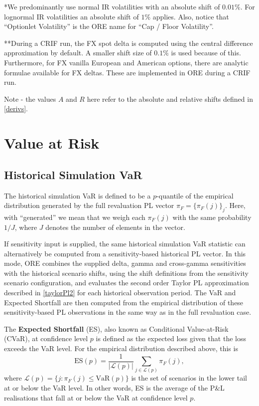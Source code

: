 \newpage
*We predominantly use normal IR volatilities with an absolute shift of $0.01\%$. For lognormal IR volatilities an absolute shift of $1\%$ applies. Also, notice that ``Optionlet Volatility'' is the ORE name for ``Cap / Floor Volatility''.

**During a CRIF run, the FX spot delta is computed using the central difference approximation by default. A smaller shift size of $0.1\%$ is used because of this. Furthermore, for FX vanilla European and American options, there are analytic formulae available for FX deltas. These are implemented in ORE during a CRIF run.

Note - the values $A$ and $R$ here refer to the absolute and relative shifts defined in \eqref{derivs}.

\section{Value at Risk}\label{sec:app_var}

\subsection{Historical Simulation VaR}\label{histsimvar}

The historical simulation VaR is defined to be a $p$-quantile of the empirical distribution generated by the full
revaluation PL vector $\pi_F = \{ \pi_F(j) \}_{j}$. Here, with ``generated'' we mean that we weigh each $\pi_F(j)$ with
the same probability $1/J$, where $J$ denotes the number of elements in the vector.

If sensitivity input is supplied, the same historical simulation VaR statistic can alternatively be computed from a sensitivity-based
historical PL vector. In this mode, ORE combines the supplied delta, gamma and cross-gamma sensitivities with the
historical scenario shifts, using the shift definitions from the sensitivity scenario configuration, and evaluates the
second order Taylor PL approximation described in \eqref{taylorPl2} for each historical observation period. The VaR
and Expected Shortfall are then computed from the empirical distribution of these sensitivity-based PL observations in
the same way as in the full revaluation case.

The \textbf{Expected Shortfall} (ES), also known as Conditional Value-at-Risk (CVaR), at confidence level $p$ is
defined as the expected loss given that the loss exceeds the VaR level. For the empirical distribution described above, this is
$$
\text{ES}(p) = \frac{1}{|\mathcal{L}(p)|}\sum_{j \in \mathcal{L}(p)} \pi_F(j) ,
$$
where $\mathcal{L}(p) = \bigl\{ j : \pi_F(j) \leq \text{VaR}(p) \bigr\}$ is the set of scenarios in the lower
tail at or below the VaR level. In other words, ES is the average of the P\&L realisations that fall at or below
the VaR at confidence level $p$.

